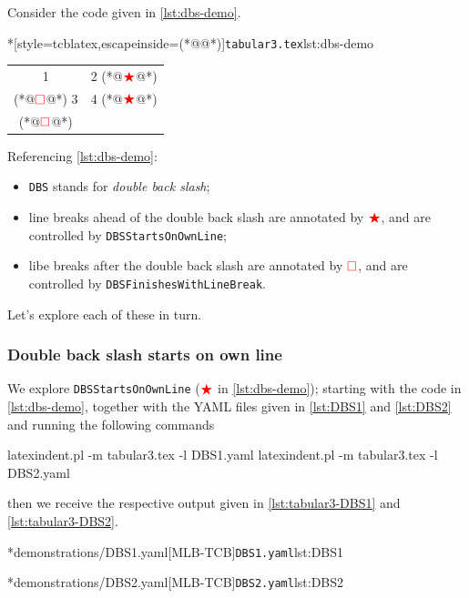 	Consider the code given in \cref{lst:dbs-demo}.
	\begin{cmhlistings}*[style=tcblatex,escapeinside={(*@}{@*)}]{\texttt{tabular3.tex}}{lst:dbs-demo}
\begin{tabular}{cc}
 1 & 2 (*@$\color{red}\bigstar$@*)\\(*@$\color{red}\square$@*) 3 & 4 (*@$\color{red}\bigstar$@*)\\(*@$\color{red}\square$@*)
\end{tabular}
\end{cmhlistings}
	Referencing \cref{lst:dbs-demo}:
	\begin{itemize}
		\item \texttt{DBS} stands for \emph{double back slash};
		\item line breaks ahead of the double back slash are annotated by $\color{red}\bigstar$,
		      and are controlled by \texttt{DBSStartsOnOwnLine};
		\item libe breaks after the double back slash are annotated by $\color{red}\square$, and
		      are controlled by \texttt{DBSFinishesWithLineBreak}.
	\end{itemize}

	Let's explore each of these in turn.

\subsubsection{Double back slash starts on own line}
	We explore \texttt{DBSStartsOnOwnLine} ($\color{red}\bigstar$ in \cref{lst:dbs-demo}); starting with the code in
	\cref{lst:dbs-demo}, together with the YAML files given in
	\cref{lst:DBS1} and \cref{lst:DBS2} and running the following
	commands
	\begin{commandshell}
latexindent.pl -m tabular3.tex -l DBS1.yaml
latexindent.pl -m tabular3.tex -l DBS2.yaml
            \end{commandshell}
	then we receive the respective output given in \cref{lst:tabular3-DBS1} and
	\cref{lst:tabular3-DBS2}.

	\begin{cmhtcbraster}[raster column skip=.01\linewidth]
		\cmhlistingsfromfile*[style=yaml-LST]*{demonstrations/DBS1.yaml}[MLB-TCB]{\texttt{DBS1.yaml}}{lst:DBS1}
	\end{cmhtcbraster}

	\begin{cmhtcbraster}[raster column skip=.01\linewidth]
		\cmhlistingsfromfile*[style=yaml-LST]*{demonstrations/DBS2.yaml}[MLB-TCB]{\texttt{DBS2.yaml}}{lst:DBS2}
	\end{cmhtcbraster}

